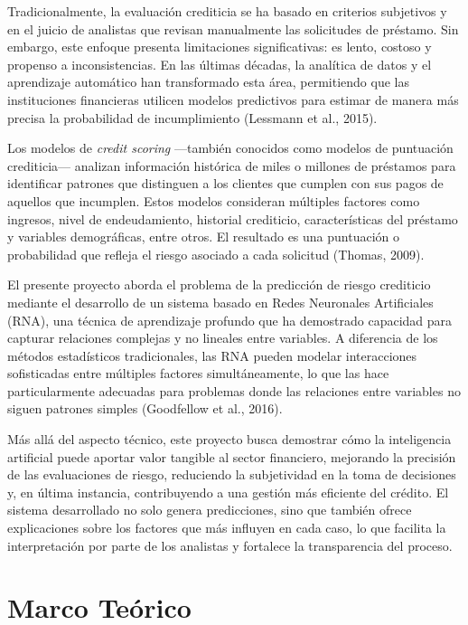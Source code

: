\documentclass[12pt,a4paper]{article}
\begin{document}
Tradicionalmente, la evaluación crediticia se ha basado en criterios subjetivos y en el juicio de analistas que revisan manualmente las solicitudes de préstamo. Sin embargo, este enfoque presenta limitaciones significativas: es lento, costoso y propenso a inconsistencias. En las últimas décadas, la analítica de datos y el aprendizaje automático han transformado esta área, permitiendo que las instituciones financieras utilicen modelos predictivos para estimar de manera más precisa la probabilidad de incumplimiento (Lessmann et al., 2015).

Los modelos de \textit{credit scoring} ---también conocidos como modelos de puntuación crediticia--- analizan información histórica de miles o millones de préstamos para identificar patrones que distinguen a los clientes que cumplen con sus pagos de aquellos que incumplen. Estos modelos consideran múltiples factores como ingresos, nivel de endeudamiento, historial crediticio, características del préstamo y variables demográficas, entre otros. El resultado es una puntuación o probabilidad que refleja el riesgo asociado a cada solicitud (Thomas, 2009).

El presente proyecto aborda el problema de la predicción de riesgo crediticio mediante el desarrollo de un sistema basado en Redes Neuronales Artificiales (RNA), una técnica de aprendizaje profundo que ha demostrado capacidad para capturar relaciones complejas y no lineales entre variables. A diferencia de los métodos estadísticos tradicionales, las RNA pueden modelar interacciones sofisticadas entre múltiples factores simultáneamente, lo que las hace particularmente adecuadas para problemas donde las relaciones entre variables no siguen patrones simples (Goodfellow et al., 2016).

Más allá del aspecto técnico, este proyecto busca demostrar cómo la inteligencia artificial puede aportar valor tangible al sector financiero, mejorando la precisión de las evaluaciones de riesgo, reduciendo la subjetividad en la toma de decisiones y, en última instancia, contribuyendo a una gestión más eficiente del crédito. El sistema desarrollado no solo genera predicciones, sino que también ofrece explicaciones sobre los factores que más influyen en cada caso, lo que facilita la interpretación por parte de los analistas y fortalece la transparencia del proceso.

\section{Marco Teórico}
\end{document}

